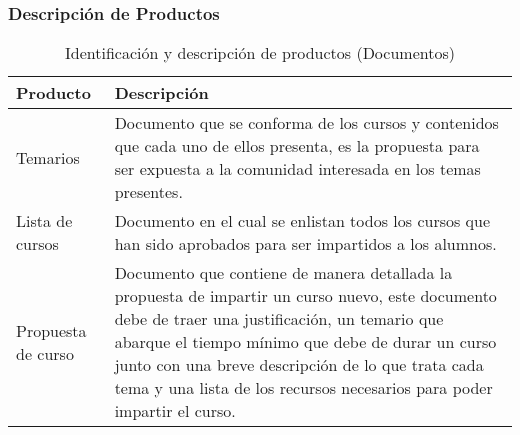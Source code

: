 \newpage
\subsubsection{Descripción de Productos}

\begin{table}[H]
\centering
	\begin{tabular}{p{5cm}|p{11cm}}
		\hline
			\textbf{Producto} & \textbf{Descripción}\\ %
		\hline\hline %
			{Temarios} & {Documento que se conforma de los cursos y contenidos que cada uno de ellos presenta, es la propuesta para ser expuesta a la comunidad interesada en los temas presentes.}\\ %
			\hline
			{Lista de cursos} & {Documento en el cual se enlistan todos los cursos que han sido aprobados para ser impartidos a los alumnos.}\\ 
			\hline
			{Propuesta de curso} & {Documento que contiene de manera detallada la propuesta de impartir un curso nuevo, este documento debe de traer una justificación, un temario que abarque el tiempo mínimo que debe de durar un curso junto con una breve descripción de lo que trata cada tema y una lista de los recursos necesarios para poder impartir el curso.}\\ 
	\end{tabular}
\caption{Identificación y descripción de productos (Documentos)}
\end{table}

